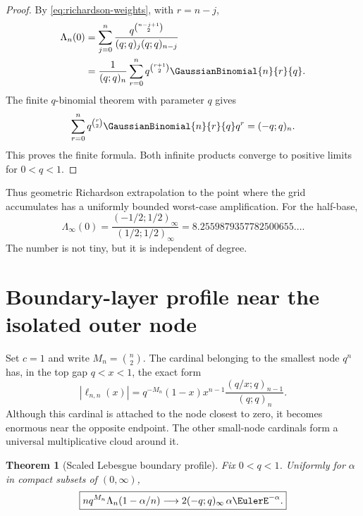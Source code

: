 \documentclass[11pt,oneside]{book}
\numberwithin{equation}{chapter}
\newtheorem{theorem}{Theorem}[chapter]
\theoremstyle{definition}
\theoremstyle{remark}
\newcommand{\Leb}{\Lambda}
\begin{document}
\begin{proof}
By \eqref{eq:richardson-weights}, with $r=n-j$,
\begin{align*}
 \Leb_n(0)
 &=\sum_{j=0}^n
   \frac{q^{\binom{n-j+1}{2}}}{(q;q)_j(q;q)_{n-j}}\\
 &=\frac1{(q;q)_n}\sum_{r=0}^n
   q^{\binom{r+1}{2}}\GaussianBinomial{n}{r}{q}.
\end{align*}
The finite $q$-binomial theorem with parameter $q$ gives
\[
 \sum_{r=0}^nq^{\binom r2}\GaussianBinomial{n}{r}{q}q^r=(-q;q)_n.
\]
This proves the finite formula.  Both infinite products converge to positive
limits for $0<q<1$.
\end{proof}

Thus geometric Richardson extrapolation to the point where the grid
accumulates has a uniformly bounded worst-case amplification.  For the
half-base,
\begin{equation}
 \Leb_\infty(0)
 =\frac{(-1/2;1/2)_\infty}{(1/2;1/2)_\infty}
 =8.2559879357782500655\ldots.
 \label{eq:half-endpoint-constant}
\end{equation}
The number is not tiny, but it is independent of degree.

\section{Boundary-layer profile near the isolated outer node}

Set $c=1$ and write $M_n=\binom n2$.  The cardinal belonging to the smallest
node $q^n$ has, in the top gap $q<x<1$, the exact form
\begin{equation}
 |\ell_{n,n}(x)|
 =q^{-M_n}(1-x)x^{n-1}
   \frac{(q/x;q)_{n-1}}{(q;q)_n}.
 \label{eq:last-cardinal-top-gap}
\end{equation}
Although this cardinal is attached to the node closest to zero, it becomes
enormous near the opposite endpoint.  The other small-node cardinals form a
universal multiplicative cloud around it.

\begin{theorem}[Scaled Lebesgue boundary profile]
\label{thm:lebesgue-profile}
Fix $0<q<1$.  Uniformly for $\alpha$ in compact subsets of $(0,\infty)$,
\begin{equation}
 \boxed{
 n q^{M_n}\Leb_n(1-\alpha/n)
 \longrightarrow
 2(-q;q)_\infty\,\alpha\EulerE^{-\alpha}.}
 \label{eq:lebesgue-profile}
\end{equation}
\end{theorem}
\end{document}
